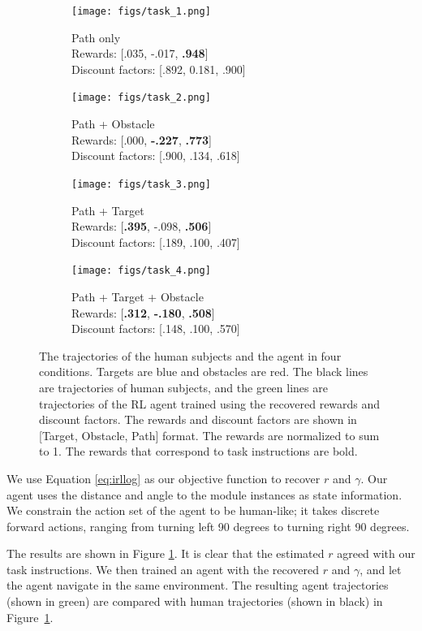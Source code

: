 \documentclass[12pt]{report}	%
\theoremstyle{definition}
\theoremstyle{remark}
\begin{document}
\begin{figure}
\centering
\begin{subfigure}[b]{0.48\textwidth}
\texttt{[image: figs/task\_1.png]}
\caption{Path only\\
Rewards: [.035, -.017, {\bf .948}]\\
Discount factors: [.892, 0.181, .900]}
\end{subfigure}
\begin{subfigure}[b]{0.48\textwidth}
\texttt{[image: figs/task\_2.png]}
\caption{Path + Obstacle \\
Rewards: [.000, {\bf -.227}, {\bf .773}]\\
Discount factors: [.900, .134, .618]}
\end{subfigure}
\begin{subfigure}[b]{0.48\textwidth}
\texttt{[image: figs/task\_3.png]}
\caption{Path + Target\\
Rewards: [{\bf .395}, -.098, {\bf .506}]\\
Discount factors: [.189, .100, .407]}
\end{subfigure}
\begin{subfigure}[b]{0.48\textwidth}
\texttt{[image: figs/task\_4.png]}
\caption{Path + Target + Obstacle \\
Rewards: [{\bf .312}, {\bf -.180}, {\bf .508}]\\
Discount factors: [.148, .100, .570]}
\end{subfigure}
\caption{The trajectories of the human subjects and the agent in four conditions. Targets are
blue and obstacles are red. The black lines are trajectories of human subjects,
and the green lines are trajectories of the RL agent trained using the recovered
rewards and discount factors. The rewards and discount factors are shown in [Target,
Obstacle, Path] format. The rewards are normalized to sum to 1. The rewards that
correspond to task instructions are bold.}
\label{fig:exp}
\end{figure}

We use Equation \ref{eq:irllog} as our objective function to recover $r$ and $\gamma$. Our agent uses the distance and angle to the module instances as state information. We constrain the action set of the agent to be human-like; it takes discrete forward actions, ranging from turning left 90 degrees to turning right 90 degrees. 

The results are shown in Figure \ref{fig:exp}. It is clear that the estimated $r$ agreed with our task instructions. We then trained an agent with the recovered $r$ and $\gamma$, and let the agent navigate in the same environment. The resulting agent trajectories (shown in green) are compared with human trajectories (shown in black) in Figure~\ref{fig:exp}. 
\end{document}
